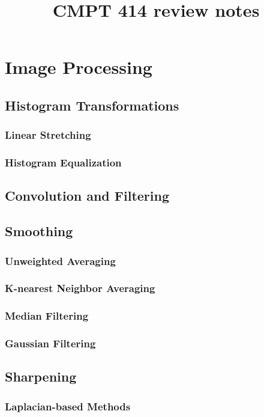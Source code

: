 \documentclass{article}
\title{CMPT 414 review notes}
\author{}
\date{}
\begin{document}
\maketitle

\section{Image Processing}
\subsection{Histogram Transformations}
\subsubsection{Linear Stretching}
\subsubsection{Histogram Equalization}
\subsection{Convolution and Filtering}
\subsection{Smoothing}
\subsubsection{Unweighted Averaging}
\subsubsection{K-nearest Neighbor Averaging}
\subsubsection{Median Filtering}
\subsubsection{Gaussian Filtering}
\subsection{Sharpening}
\subsubsection{Laplacian-based Methods}
\end{document}
